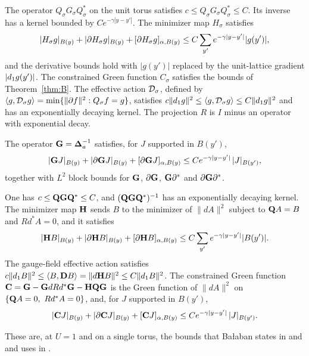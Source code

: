 \begin{maintheorem}\label{thm:C}
The operator $Q_\sigma G_\sigma Q_\sigma^*$ on the unit torus satisfies $c\le Q_\sigma G_\sigma Q_\sigma^*\le C$. Its inverse has a kernel bounded by $Ce^{-\gamma|y-y'|}$. The minimizer map $H_\sigma$ satisfies
\[
|H_\sigma g|_{B(y)}+|\partial H_\sigma g|_{B(y)}+[\partial H_\sigma g]_{\alpha,B(y)}\le C\sum_{y'}e^{-\gamma|y-y'|}|g(y')|,
\]
and the derivative bounds hold with $|g(y')|$ replaced by the unit-lattice gradient $|d_1 g(y')|$. The constrained Green function $C_\sigma$ satisfies the bounds of Theorem~\ref{thm:B}. The effective action $\mathcal D_\sigma$, defined by $\langle g,\mathcal D_\sigma g\rangle=\min\{\|\partial f\|^2:Q_\sigma f=g\}$, satisfies $c\|d_1 g\|^2\le\langle g,\mathcal D_\sigma g\rangle\le C\|d_1 g\|^2$ and has an exponentially decaying kernel. The projection $R$ is $I$ minus an operator with exponential decay.
\end{maintheorem}

\begin{maintheorem}\label{thm:D}
The operator $\mathbf G=\boldsymbol{\Delta}_a^{-1}$ satisfies, for $J$ supported in $B(y')$,
\[
|\mathbf G J|_{B(y)}+|\partial\mathbf G J|_{B(y)}+[\partial\mathbf G J]_{\alpha,B(y)}\le Ce^{-\gamma|y-y'|}\,|J|_{B(y')},
\]
together with $L^2$ block bounds for $\mathbf G$, $\partial\mathbf G$, $\mathbf G\partial^*$ and $\partial\mathbf G\partial^*$.
\end{maintheorem}

\begin{maintheorem}\label{thm:E}
One has $c\le\mathbf Q\mathbf G\mathbf Q^*\le C$, and $(\mathbf Q\mathbf G\mathbf Q^*)^{-1}$ has an exponentially decaying kernel. The minimizer map $\mathbf H$ sends $B$ to the minimizer of $\|dA\|^2$ subject to $\mathbf Q A=B$ and $Rd^*A=0$, and it satisfies
\[
|\mathbf H B|_{B(y)}+|\partial\mathbf H B|_{B(y)}+[\partial\mathbf H B]_{\alpha,B(y)}\le C\sum_{y'}e^{-\gamma|y-y'|}|B(y')|.
\]
The gauge-field effective action satisfies $c\|d_1 B\|^2\le\langle B,\mathbf D B\rangle=\|d\mathbf H B\|^2\le C\|d_1 B\|^2$. The constrained Green function $\mathbf C=\mathbf G-\mathbf G dRd^*\mathbf G-\mathbf H\mathbf Q\mathbf G$ is the Green function of $\|dA\|^2$ on $\{\mathbf Q A=0,\ Rd^*A=0\}$, and, for $J$ supported in $B(y')$,
\[
|\mathbf C J|_{B(y)}+|\partial\mathbf C J|_{B(y)}+[\mathbf C J]_{\alpha,B(y)}\le Ce^{-\gamma|y-y'|}\,|J|_{B(y')}.
\]
\end{maintheorem}

These are, at $U=1$ and on a single torus, the bounds that Ba\l aban states in \cite[Sect.~F]{BalPropI} and \cite[Theorems~3.12, 3.13]{BalBackground} and uses in \cite{BalVar}.

